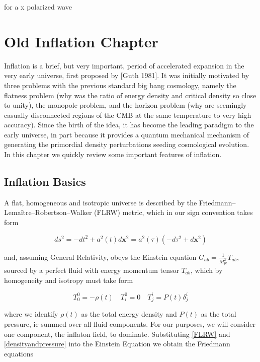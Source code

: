 \documentclass[a4paper,10pt]{article}
\renewcommand{\v}[1]{\mathbf{#1}}
\newcommand{\Mp}{M_{pl}}
\begin{document}
for a x polarized wave


\section{Old Inflation Chapter}

Inflation is a brief, but very important, period of accelerated expansion in the very early universe, first proposed by [Guth 1981]. It was initially motivated by three problems with the previous standard big bang cosmology, namely the flatness problem (why was the ratio of energy density and critical density so close to unity), the monopole problem, and the horizon problem (why are seemingly casually disconnected regions of the CMB at the same temperature to very high accuracy). Since the birth of the idea, it has become the leading paradigm to the early universe, in part because it provides a quantum mechanical mechanism of generating the primordial density perturbations seeding cosmological evolution. In this chapter we quickly review some important features of inflation.

\subsection{Inflation Basics}

A flat, homogeneous and isotropic universe is described by the Friedmann–Lemaître–Robertson–Walker (FLRW) metric, which in our sign convention takes form

\begin{equation}
\label{FLRW}
ds^2 = - dt^2 + a^2(t)d\v{x}^2 = a^2(\tau)(-d\tau^2+d\v{x}^2)
\end{equation}

and, assuming General Relativity, obeys the Einstein equation $G_{ab} = \frac{1}{\Mp^2} T_{ab}$, sourced by a perfect fluid with energy momentum tensor $T_{ab}$, which by homogeneity and isotropy must take form

\begin{equation}
\label{densityandpressure}
T^0_0 = - \rho(t) \quad T^0_i = 0 \quad T^i_j = P(t)\delta^i_j
\end{equation}

where we  identify $\rho(t)$ as the total energy density and $P(t)$ as the total pressure, ie summed over all fluid components. For our purposes, we will consider one component, the inflaton field, to dominate.  Substituting \ref{FLRW} and \ref{densityandpressure} into the Einstein Equation we obtain the Friedmann equations
\end{document}
